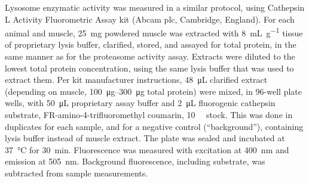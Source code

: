 \documentclass[12pt,english]{report}\usepackage[]{graphicx}\usepackage[]{color}
\begin{document}
Lysosome enzymatic activity was measured in a similar protocol, using
Cathepsin L Activity Fluorometric Assay kit (Abcam plc, Cambridge,
England). For each animal and muscle, \SI{25}{\milli\gram} powdered
muscle was extracted with \SI{8}{\milli\liter\per\gram} tissue of
proprietary lysis buffer, clarified, stored, and assayed for total
protein, in the same manner as for the proteasome activity assay.
Extracts were diluted to the lowest total protein concentration, using
the same lysis buffer that was used to extract them. Per kit manufacturer
instructions, \SI{48}{\micro\liter} clarified extract (depending
on muscle, \SIrange{100}{300}{\micro\gram} total protein) were mixed,
in 96-well plate wells, with \SI{50}{\micro\liter} proprietary assay
buffer and \SI{2}{\micro\liter} fluorogenic cathepsin substrate,
FR-amino-4-trifluoromethyl coumarin, \SI{10}{\milli\molar} stock.
This was done in duplicates for each sample, and for a negative control
(``background''), containing lysis buffer instead of muscle extract.
The plate was sealed and incubated at \SI{37}{\celsius} for \SI{30}{\minute}.
Fluorescence was measured with excitation at \SI{400}{\nano\meter}
and emission at \SI{505}{\nano\meter}. Background fluorescence, including
substrate, was subtracted from sample measurements.
\end{document}
